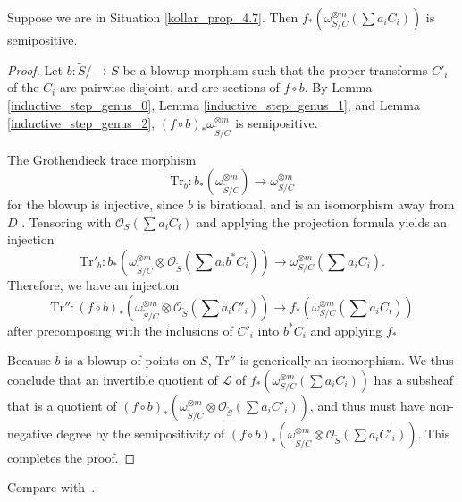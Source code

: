 \begin{lemma}
Suppose we are in Situation \ref{kollar_prop_4.7}.
Then $f_{*}\left(\omega_{S/C}^{\otimes m}\left(\sum a_iC_i\right)\right)$ is semipositive.
\end{lemma}
\begin{proof}
Let $b:\widetilde{S}/\to S$ be a blowup morphism such that the proper transforms $C'_i$ of the $C_i$ are pairwise disjoint, and are sections of $f\circ b$.
By Lemma \ref{inductive_step_genus_0}, Lemma \ref{inductive_step_genus_1}, and Lemma \ref{inductive_step_genus_2}, $(f\circ b)_{*}\omega_{\widetilde{S}/C}^{\otimes m}$ is semipositive.

The Grothendieck trace morphism
$$
\mathrm{Tr}_b : b_*(\omega_{\widetilde{S}/C}^{\otimes m})
\longrightarrow \omega_{S/C}^{\otimes m}
$$
for the blowup is injective, since $b$ is birational, and is an isomorphism away
from $D$ \cite[Prop.\ 5.77]{km}.
Tensoring with $\mathcal{O}_{S}\left(\sum a_iC_i\right)$ and applying the
projection formula yields an injection
$$
\mathrm{Tr}'_b : b_*\left(\omega_{\widetilde{S}/C}^{\otimes m}\otimes\mathcal{O}_{\widetilde{S}}\left(\sum a_ib^{*}C_i\right)\right)
\longrightarrow \omega_{S/C}^{\otimes m}\left(\sum a_iC_i\right).
$$
Therefore, we have an injection
$$
\mathrm{Tr}'':(f\circ b)_{*}\left(\omega_{\widetilde{S}/C}^{\otimes m}\otimes\mathcal{O}_{\widetilde{S}}\left(\sum a_iC'_i\right)\right)
\longrightarrow f_{*}\left(\omega_{S/C}^{\otimes m}\left(\sum a_iC_i\right)\right)
$$
after precomposing with the inclusions of $C'_i$ into $b^*C_i$ and applying $f_*$.

Because $b$ is a blowup of points on $S$, $\mathrm{Tr}''$ is generically an isomorphism.
We thus conclude that an invertible quotient of $\mathcal{L}$ of $f_{*}\left(\omega_{S/C}^{\otimes m}\left(\sum a_iC_i\right)\right)$ has a subsheaf that is a quotient of $(f\circ b)_{*}\left(\omega_{\widetilde{S}/C}^{\otimes m}\otimes\mathcal{O}_{\widetilde{S}}\left(\sum a_iC'_i\right)\right)$, and thus must have non-negative degree by the semipositivity of $(f\circ b)_{*}\left(\omega_{\widetilde{S}/C}^{\otimes m}\otimes\mathcal{O}_{\widetilde{S}}\left(\sum a_iC'_i\right)\right)$.
This completes the proof.
\end{proof}

Compare with~\cite[Theorem 4.9]{ko90}.

